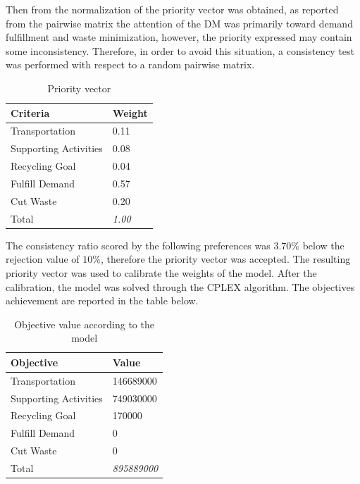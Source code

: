 \begin{doublespace}
Then from the normalization of the priority vector was obtained, as reported from the pairwise matrix the attention of the DM was primarily toward demand fulfillment and waste minimization, however, the priority expressed may contain some inconsistency. Therefore, in order to avoid this situation, a consistency test was performed with respect to a random pairwise matrix.

\begin{table}[]
\centering
\begin{tabular}{@{}ll@{}}
\toprule
\textbf{Criteria}     & Weight        \\ \midrule
Transportation        & 0.11          \\
Supporting Activities & 0.08          \\
Recycling Goal        & 0.04          \\
Fulfill Demand        & 0.57          \\
Cut Waste             & 0.20          \\
Total                 & \textit{1.00} \\ \bottomrule
\end{tabular}
\caption{Priority vector}
\end{table}

The consistency ratio scored by the following preferences was $3.70\%$ below the rejection value of $10\%$, therefore the priority vector was accepted. The resulting priority vector was used to calibrate the weights of the model. After the calibration, the model was solved through the CPLEX algorithm. The objectives achievement are reported in the table below.

\begin{table}[]
\centering
\begin{tabular}{@{}ll@{}}
\toprule
\textbf{Objective}    & Value         \\ \midrule
Transportation        & 146689000     \\
Supporting Activities & 749030000     \\
Recycling Goal        &    170000     \\
Fulfill Demand        &         0     \\
Cut Waste             &         0     \\
Total                 & \textit{895889000} \\ \bottomrule
\end{tabular}
\caption{Objective value according to the model}
\end{table}


\end{doublespace}
